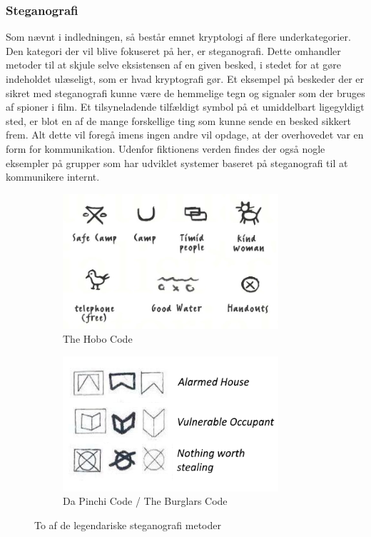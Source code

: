 \subsubsection{Steganografi}
Som nævnt i indledningen, så består emnet kryptologi af flere underkategorier. Den kategori der vil blive fokuseret på her, er steganografi. Dette omhandler metoder til at skjule selve eksistensen af en given besked, i stedet for at gøre indeholdet ulæseligt, som er hvad kryptografi gør.\cite{MeningOfSteganografi} Et eksempel på beskeder der er sikret med steganografi kunne være de hemmelige tegn og signaler som der bruges af spioner i film. Et tilsyneladende tilfældigt symbol på et umiddelbart ligegyldigt sted, er blot en af de mange forskellige ting som kunne sende en besked sikkert frem. Alt dette vil foregå imens ingen andre vil opdage, at der overhovedet var en form for kommunikation. Udenfor fiktionens verden findes der også nogle eksempler på grupper som har udviklet systemer baseret på steganografi til at kommunikere internt.
\begin{figure}[H]
    \begin{subfigure}{0.5\textwidth}
    \includegraphics[width=0.9\linewidth, height=5cm]{Projectdoc/Problemanalyse/Illustrationer/hobo.jpg} 
    \caption{The Hobo Code}
    \label{fig:hobocode}
    \end{subfigure}
    \begin{subfigure}{0.5\textwidth}
    \includegraphics[width=0.9\linewidth, height=5cm]{Projectdoc/Problemanalyse/Illustrationer/da-code.png}
    \caption{Da Pinchi Code / The Burglars Code}
    \label{fig:burglarscode}
    \end{subfigure}
    \caption{To af de legendariske steganografi metoder}
    \label{fig:legendscode}
\end{figure}
